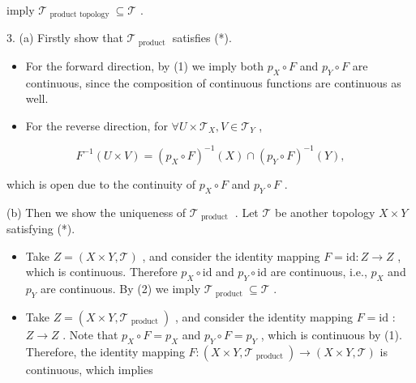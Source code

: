 imply \({\mathcal{T}}_{\text{ product topology }} \subseteq  \mathcal{T}\) .

3. (a) Firstly show that \({\mathcal{T}}_{\text{ product }}\) satisfies (*).

\begin{itemize}
\item For the forward direction, by (1) we imply both \({p}_{X} \circ  F\) and \({p}_{Y} \circ  F\) are continuous, since the composition of continuous functions are continuous as well.
\end{itemize}

\begin{itemize}
\item For the reverse direction, for \(\forall U \times  {\mathcal{T}}_{X},V \in  {\mathcal{T}}_{Y}\) ,
\end{itemize}

\[
{F}^{-1}\left( {U \times  V}\right)  = {\left( {p}_{X} \circ  F\right) }^{-1}\left( X\right)  \cap  {\left( {p}_{Y} \circ  F\right) }^{-1}\left( Y\right) ,
\]

which is open due to the continuity of \({p}_{X} \circ  F\) and \({p}_{Y} \circ  F\) .

(b) Then we show the uniqueness of \({\mathcal{T}}_{\text{ product }}\) . Let \(\mathcal{T}\) be another topology \(X \times  Y\) satisfying (*).

\begin{itemize}
\item Take \(Z = \left( {X \times  Y,\mathcal{T}}\right)\) , and consider the identity mapping \(F = \mathrm{{id}} : Z \rightarrow  Z\) , which is continuous. Therefore \({p}_{X} \circ  \mathrm{{id}}\) and \({p}_{Y} \circ  \mathrm{{id}}\) are continuous, i.e., \({p}_{X}\) and \({p}_{Y}\) are continuous. By (2) we imply \({\mathcal{T}}_{\text{ product }} \subseteq  \mathcal{T}\) .
\end{itemize}

\begin{itemize}
\item Take \(Z = \left( {X \times  Y,{\mathcal{T}}_{\text{ product }}}\right)\) , and consider the identity mapping \(F = \mathrm{{id}}\) : \(Z \rightarrow  Z\) . Note that \({p}_{X} \circ  F = {p}_{X}\) and \({p}_{Y} \circ  F = {p}_{Y}\) , which is continuous by (1). Therefore, the identity mapping \(F : \left( {X \times  Y,{\mathcal{T}}_{\text{ product }}}\right)  \rightarrow  \left( {X \times  Y,\mathcal{T}}\right)\) is continuous, which implies
\end{itemize}

